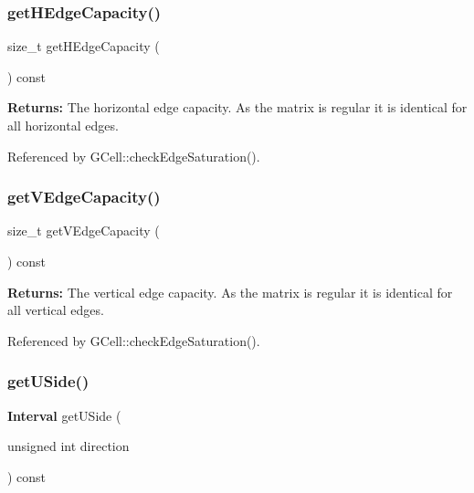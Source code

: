 \subsubsection{\texorpdfstring{get\+H\+Edge\+Capacity()}{getHEdgeCapacity()}}
{\footnotesize\ttfamily size\+\_\+t get\+H\+Edge\+Capacity (\begin{DoxyParamCaption}{ }\end{DoxyParamCaption}) const\hspace{0.3cm}{\ttfamily [inline]}}

{\bfseries Returns\+:} The horizontal edge capacity. As the matrix is regular it is identical for all horizontal edges. 

Referenced by G\+Cell\+::check\+Edge\+Saturation().

\mbox{\label{classKatabatic_1_1GCellGrid_ae8e2cf3685ccb0621f4f85c7999834e8}} 
\subsubsection{\texorpdfstring{get\+V\+Edge\+Capacity()}{getVEdgeCapacity()}}
{\footnotesize\ttfamily size\+\_\+t get\+V\+Edge\+Capacity (\begin{DoxyParamCaption}{ }\end{DoxyParamCaption}) const\hspace{0.3cm}{\ttfamily [inline]}}

{\bfseries Returns\+:} The vertical edge capacity. As the matrix is regular it is identical for all vertical edges. 

Referenced by G\+Cell\+::check\+Edge\+Saturation().

\mbox{\label{classKatabatic_1_1GCellGrid_a8272dad8f7d916333f934f3cbde981bb}} 
\subsubsection{\texorpdfstring{get\+U\+Side()}{getUSide()}}
{\footnotesize\ttfamily \textbf{ Interval} get\+U\+Side (\begin{DoxyParamCaption}\item[{unsigned int}]{direction }\end{DoxyParamCaption}) const}

